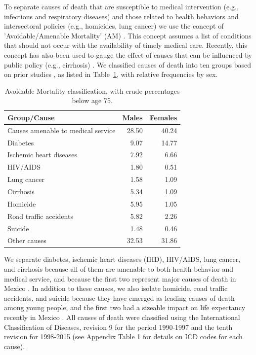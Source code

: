 \documentclass{article}
\begin{document}
\begin{spacing}{1.5}
To separate causes of death that are susceptible to medical intervention (e.g.,
infectious and respiratory diseases) and those related to health behaviors and
intersectoral policies (e.g., homicides, lung cancer) we use the concept of
'Avoidable/Amenable Mortality' (AM) \citep{nolte&mckee2004, nolte&mckee2008}. This
concept assumes a list of conditions that should not occur with the availability
of timely medical care. Recently, this concept has also been used to gauge the
effect of causes that can be influenced by public policy (e.g., cirrhosis) \citep{elo2014}. We classified causes of death into ten groups based on prior studies
\citep{elo2014, Aburto2015}, as listed in Table~\ref{tab:causes}, with
relative frequencies by sex.

\begin{table}[ht]
\centering
\caption{Avoidable Mortality classification, with crude percentages below age 75.}
\label{tab:causes}
\begin{tabular}{>{\raggedright}m{3cm}rr}
Group/Cause  & Males & Females \\ 
  \hline
Causes amenable to medical service & 28.50 & 40.24 \\ 
  Diabetes & 9.07 & 14.77 \\ 
  Ischemic heart diseases & 7.92 & 6.66 \\ 
  HIV/AIDS & 1.80 & 0.51 \\ 
  Lung cancer & 1.58 & 1.09 \\ 
  Cirrhosis & 5.34 & 1.09 \\ 
  Homicide & 5.95 & 1.05 \\ 
  Road traffic accidents & 5.82 & 2.26 \\ 
  Suicide & 1.48 & 0.46 \\ 
  Other causes & 32.53 & 31.86 \\ 
   \hline
\end{tabular}
\end{table}

We separate diabetes, ischemic heart diseases (IHD), HIV/AIDS, lung
cancer, and cirrhosis because all of them are amenable to both health behavior
and medical service, and because the first two represent major causes of death
in Mexico \citep{canudas2014}. In addition to these causes, we also isolate
homicide, road traffic accidents, and suicide because they have emerged as
leading causes of death among young people, and the first two had a sizeable
impact on life expectancy recently in Mexico \citep{canudas2014}. All causes of death were classified using the International Classification of Diseases, revision 9 for the period 1990-1997 and the tenth revision for 1998-2015 (see Appendix Table 1 for details on ICD codes for each cause).


\end{spacing}
\end{document}
